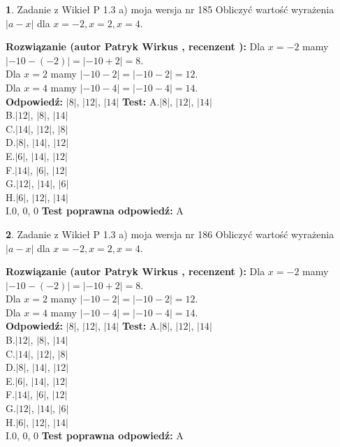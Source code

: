 \documentclass[12pt, a4paper]{article}
\theoremstyle{definition} %
\newtheorem{zad}{}
\newcommand{\zadStart}[1]{\begin{zad}#1\newline}
\newcommand{\zadStop}{\end{zad}}
\newcommand{\rozwStart}[2]{\noindent \textbf{Rozwiązanie (autor #1 , recenzent #2): }\newline}
\newcommand{\rozwStop}{\newline}
\newcommand{\odpStart}{\noindent \textbf{Odpowiedź:}\newline}
\newcommand{\odpStop}{\newline}
\newcommand{\testStart}{\noindent \textbf{Test:}\newline}
\newcommand{\testStop}{\newline}
\newcommand{\kluczStart}{\noindent \textbf{Test poprawna odpowiedź:}\newline}
\newcommand{\kluczStop}{\newline}
\begin{document}
\zadStart{Zadanie z Wikieł P 1.3 a) moja wersja nr 185}
Obliczyć wartość wyrażenia $|a - x|$ dla $x=-2,x=2,x=4$.
\zadStop
\rozwStart{Patryk Wirkus}{}
Dla $x = -2$ mamy $|-10 - (-2)| = |-10 + 2| = 8$.\\
Dla $x = 2$ mamy $|-10 - 2| = |-10 - 2| = 12$.\\
Dla $x = 4$ mamy $|-10 - 4| = |-10 - 4| = 14$.\\
\rozwStop
\odpStart
$|8|$, $|12|$, $|14|$
\odpStop
\testStart
A.$|8|$, $|12|$, $|14|$\\
B.$|12|$, $|8|$, $|14|$\\
C.$|14|$, $|12|$, $|8|$\\
D.$|8|$, $|14|$, $|12|$\\
E.$|6|$, $|14|$, $|12|$\\
F.$|14|$, $|6|$, $|12|$\\
G.$|12|$, $|14|$, $|6|$\\
H.$|6|$, $|12|$, $|14|$\\
I.$0$, $0$, $0$
\testStop
\kluczStart
A
\kluczStop



\zadStart{Zadanie z Wikieł P 1.3 a) moja wersja nr 186}
Obliczyć wartość wyrażenia $|a - x|$ dla $x=-2,x=2,x=4$.
\zadStop
\rozwStart{Patryk Wirkus}{}
Dla $x = -2$ mamy $|-10 - (-2)| = |-10 + 2| = 8$.\\
Dla $x = 2$ mamy $|-10 - 2| = |-10 - 2| = 12$.\\
Dla $x = 4$ mamy $|-10 - 4| = |-10 - 4| = 14$.\\
\rozwStop
\odpStart
$|8|$, $|12|$, $|14|$
\odpStop
\testStart
A.$|8|$, $|12|$, $|14|$\\
B.$|12|$, $|8|$, $|14|$\\
C.$|14|$, $|12|$, $|8|$\\
D.$|8|$, $|14|$, $|12|$\\
E.$|6|$, $|14|$, $|12|$\\
F.$|14|$, $|6|$, $|12|$\\
G.$|12|$, $|14|$, $|6|$\\
H.$|6|$, $|12|$, $|14|$\\
I.$0$, $0$, $0$
\testStop
\kluczStart
A
\kluczStop
\end{document}
